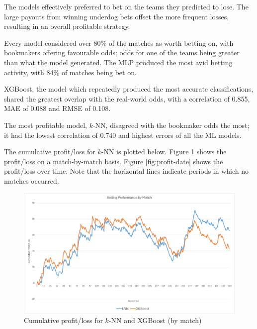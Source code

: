The models effectively preferred to bet on the teams they predicted to lose. The large payouts from winning underdog bets offset the more frequent losses, resulting in an overall profitable strategy.

Every model considered over 80\% of the matches as worth betting on, with bookmakers offering favourable odds; odds for one of the teams being greater than what the model generated. The MLP produced the most avid betting activity, with 84\% of matches being bet on.

XGBoost, the model which repeatedly produced the most accurate classifications, shared the greatest overlap with the real-world odds, with a correlation of 0.855, MAE of 0.088 and RMSE of 0.108.

The most profitable model, $k$-NN, disagreed with the bookmaker odds the most; it had the lowest correlation of 0.740 and highest errors of all the ML models.

The cumulative profit/loss for $k$-NN is plotted below. Figure \ref{fig:profit-match} shows the profit/loss on a match-by-match basis. Figure \ref{fig:profit-date} shows the profit/loss over time. Note that the horizontal lines indicate periods in which no matches occurred. 

\begin{figure}[h]
	\centering
	\begin{adjustbox}{center}
		\includegraphics[width=\textwidth]{Figures/profit-match-2.png}
	\end{adjustbox}
	\caption{Cumulative profit/loss for $k$-NN and XGBoost (by match)}
	\label{fig:profit-match}
\end{figure}

